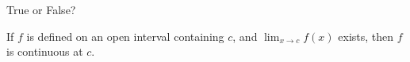 \documentclass{ximera}
\author{Gregory Hartman \and Matthew Carr}
\begin{document}
\begin{exercise}




True or False?
\begin{center}
If $f$ is defined on an open interval containing $c$, and $\lim_{x\to c}f\left({x}\right)$ exists, then $f$ is continuous at $c$.
\end{center}

\begin{prompt}
\begin{multipleChoice}
\end{multipleChoice}
\end{prompt}

\end{exercise}
\end{document}
